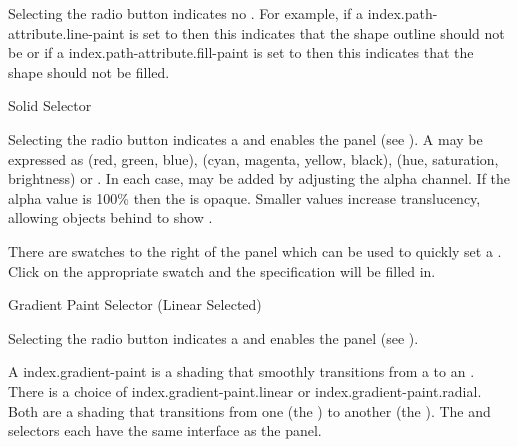 Selecting the  radio button indicates no
. For example, if a \gls{index.path-attribute.line-paint} is set to
 then this indicates that the \gls{shape}
outline should not be  or if a
\gls{index.path-attribute.fill-paint} is set to  then
this indicates that the \gls{shape} should not be filled.


{}
{Solid  Selector}

Selecting the  radio button indicates a
  and enables the
 panel (see ).  A
 may be expressed as
 (red, green, blue),
 (cyan, magenta, yellow, black),
 (hue, saturation, brightness) or
. In each case,
 may be added by adjusting
the alpha channel.  If the alpha value is 100\% then the
 is opaque.  Smaller values increase
\gls{translucency}, allowing \glspl{object} behind to show
.

There are swatches to the right of the  panel 
which can be used to quickly set a . Click on the 
appropriate swatch and the  specification will be
filled in.


{}
{Gradient Paint Selector (Linear Selected)}

Selecting the  radio button indicates a 
 and enables the
 panel (see
). 

A \gls{index.gradient-paint} is a shading that smoothly transitions
from a  to an
.  There is a choice
of \gls{index.gradient-paint.linear} or
\gls{index.gradient-paint.radial}. Both are a shading that
transitions from one  (the
) to another (the
).  The
 and  selectors
each have the same interface as the  panel.

